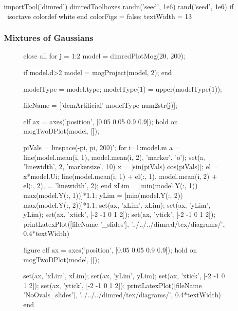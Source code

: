 \begin{matlab}
  importTool('dimred')
  dimredToolboxes
  randn('seed', 1e6)
  rand('seed', 1e6)
  if ~isoctave
    colordef white
  end
  colorFigs = false;
  textWidth = 13
\end{matlab}
\begin{frame}[fragile]
  \frametitle{Mixtures of Gaussians}

  \begin{figure}
    \begin{matlab}
    close all
    for j = 1:2
      model = dimredPlotMog(20, 200);
    
      if model.d>2
        model = mogProject(model, 2);
      end
    
      modelType = model.type;
      modelType(1) = upper(modelType(1));


      fileName = ['demArtificial' modelType num2str(j)];
    
      clf
      ax = axes('position', [0.05 0.05 0.9 0.9]);
      hold on
      mogTwoDPlot(model, []);
    

      piVals = linspace(-pi, pi, 200)';
      for i=1:model.m
        a = line(model.mean(i, 1), model.mean(i, 2), 'marker', 'o');
        set(a, 'linewidth', 2, 'markersize', 10)
        x = [sin(piVals) cos(piVals)];
        el = x*model.U{i};
        line(model.mean(i, 1) + el(:, 1), model.mean(i, 2) + el(:, 2), ...
           'linewidth', 2);
      end
      xLim = [min(model.Y(:, 1)) max(model.Y(:, 1))]*1.1;
      yLim = [min(model.Y(:, 2)) max(model.Y(:, 2))]*1.1;
      set(ax, 'xLim', xLim);
      set(ax, 'yLim', yLim);
      set(ax, 'xtick', [-2 -1 0 1 2]);
      set(ax, 'ytick', [-2 -1 0 1 2]);
      printLatexPlot([fileName '_slides'], '../../../dimred/tex/diagrams/', 0.4*textWidth)
    
      figure
      clf
      ax = axes('position', [0.05 0.05 0.9 0.9]);
      hold on
      mogTwoDPlot(model, []);
    
      set(ax, 'xLim', xLim);
      set(ax, 'yLim', yLim);
      set(ax, 'xtick', [-2 -1 0 1 2]);
      set(ax, 'ytick', [-2 -1 0 1 2]);
      printLatexPlot([fileName 'NoOvals_slides'], '../../../dimred/tex/diagrams/', 0.4*textWidth)
    end  
    \end{matlab}
    \begin{center}
          
    \end{center}
    \caption{  }
    

\end{figure}
\end{frame}
